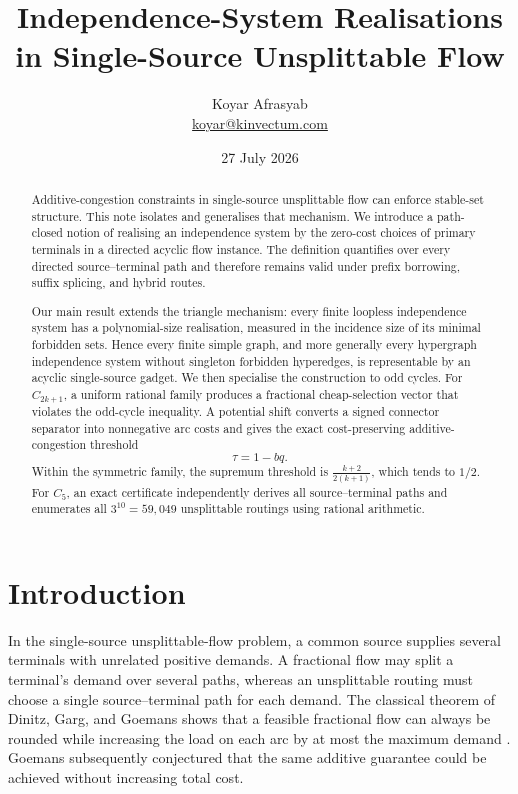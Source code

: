 \documentclass[11pt]{article}
\title{\textbf{Independence-System Realisations in Single-Source Unsplittable Flow}}
\author{Koyar Afrasyab\\
\small\href{mailto:koyar@kinvectum.com}{koyar@kinvectum.com}}
\date{27 July 2026}
\theoremstyle{definition}
\begin{document}
\maketitle

\begin{abstract}
Additive-congestion constraints in single-source unsplittable flow can enforce stable-set structure. This note isolates and generalises that mechanism. We introduce a path-closed notion of realising an independence system by the zero-cost choices of primary terminals in a directed acyclic flow instance. The definition quantifies over every directed source--terminal path and therefore remains valid under prefix borrowing, suffix splicing, and hybrid routes.

Our main result extends the triangle mechanism: every finite loopless independence system has a polynomial-size realisation, measured in the incidence size of its minimal forbidden sets. Hence every finite simple graph, and more generally every hypergraph independence system without singleton forbidden hyperedges, is representable by an acyclic single-source gadget. We then specialise the construction to odd cycles. For \(C_{2k+1}\), a uniform rational family produces a fractional cheap-selection vector that violates the odd-cycle inequality. A potential shift converts a signed connector separator into nonnegative arc costs and gives the exact cost-preserving additive-congestion threshold
\[
\tau=1-bq.
\]
Within the symmetric family, the supremum threshold is
\(\frac{k+2}{2(k+1)}\), which tends to \(1/2\).
For \(C_5\), an exact certificate independently derives all source--terminal paths and enumerates all \(3^{10}=59{,}049\) unsplittable routings using rational arithmetic.
\end{abstract}

\section{Introduction}

In the single-source unsplittable-flow problem, a common source supplies several terminals with unrelated positive demands. A fractional flow may split a terminal's demand over several paths, whereas an unsplittable routing must choose a single source--terminal path for each demand. The classical theorem of Dinitz, Garg, and Goemans shows that a feasible fractional flow can always be rounded while increasing the load on each arc by at most the maximum demand \cite{dgg1999}. Goemans subsequently conjectured that the same additive guarantee could be achieved without increasing total cost.
\end{document}
